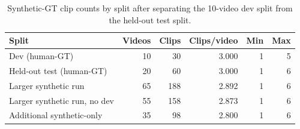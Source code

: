 \begin{table}
\caption{Synthetic-GT clip counts by split after separating the 10-video dev split from the held-out test split.}
\label{tab:cvs-act-synthetic-split-clip-counts}
\begin{tabular}{lrrrrr}
\toprule
Split & Videos & Clips & Clips/video & Min & Max \\
\midrule
Dev (human-GT) & 10 & 30 & 3.000 & 1 & 5 \\
Held-out test (human-GT) & 20 & 60 & 3.000 & 1 & 6 \\
Larger synthetic run & 65 & 188 & 2.892 & 1 & 6 \\
Larger synthetic run, no dev & 55 & 158 & 2.873 & 1 & 6 \\
Additional synthetic-only & 35 & 98 & 2.800 & 1 & 6 \\
\bottomrule
\end{tabular}
\end{table}
